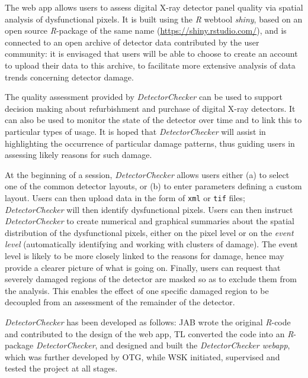 \documentclass[11pt,a4paper]{article}
\newcommand{\DetectorChecker}{\emph{DetectorChecker}\xspace}
\newcommand{\DetectorCheckerWebApp}{\emph{DetectorChecker webapp}\xspace}
\newcommand{\Rsoftware}{\emph{R}\xspace}
\begin{document}
The web app allows users to assess digital X-ray detector panel quality via spatial analysis of dysfunctional pixels.
It is built using the \Rsoftware webtool \emph{shiny}, based on an open source \Rsoftware-package of the same name (\url{https://shiny.rstudio.com/}),
and is connected to an open archive of detector data contributed by the user community:
it is envisaged that users will be able to choose to create an account to upload their data to this archive,
to facilitate more extensive analysis of data trends concerning detector damage.

The quality assessment provided by \DetectorChecker can be used to support decision making 
about refurbishment and purchase of digital X-ray detectors. 
It can also be used to monitor the state of the detector over time and to link this to particular types of usage.
It is hoped that \DetectorChecker will assist in highlighting the occurrence of particular damage patterns, thus guiding
users in assessing likely reasons for such damage.

At the beginning of a session, 
\DetectorChecker allows users either (a) to select one of the common detector layouts,
or (b) to enter parameters defining a custom layout. 
Users can then upload data in the form of \texttt{xml} or \texttt{tif} files;
\DetectorChecker will then identify dysfunctional pixels.
Users can then instruct
\DetectorChecker to create numerical and graphical summaries 
about the spatial distribution of the dysfunctional pixels,
either on the pixel level or on the \emph{event level}
(automatically identifying and working with clusters of damage). The event level is likely to be more
closely linked to the reasons for damage, hence may provide a clearer picture 
of what is going on.
Finally, users can request that severely damaged regions of the detector are masked so as 
to exclude them from the analysis. This enables the effect of one specific damaged region 
to be decoupled from an assessment of the remainder of the detector.

\DetectorChecker has been developed as follows:
JAB wrote the original \Rsoftware-code and contributed to the design of the web app, 
TL converted the code into an \Rsoftware-package
\DetectorChecker,
and designed and built the 
\DetectorCheckerWebApp, 
which was further developed by OTG, while WSK initiated, supervised and tested the project at all stages. 
 
\end{document}
